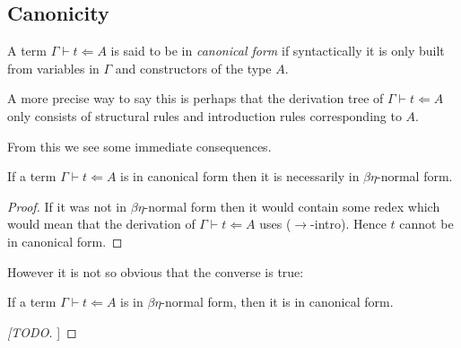 
\subsection{Canonicity}

\begin{defin}
    A term $\Gamma \vdash t \Leftarrow A$ is said to be in \emph{canonical form} if syntactically it is only built from variables in $\Gamma$ and constructors of the type $A$.
\end{defin}

\begin{remark}
    A more precise way to say this is perhaps that the derivation tree of $\Gamma \vdash t \Leftarrow A$ only consists of structural rules and introduction rules corresponding to $A$.
\end{remark}

From this we see some immediate consequences.

\begin{lemma}
    If a term $\Gamma \vdash t \Leftarrow A$ is in canonical form then it is necessarily in $\beta \eta$-normal form.
\end{lemma}

\begin{proof}
    If it was not in $\beta \eta$-normal form then it would contain some redex which would mean that the derivation of $\Gamma \vdash t \Leftarrow A$ uses ($\to$-intro). Hence $t$ cannot be in canonical form.
\end{proof}

However it is not so obvious that the converse is true:

\begin{lemma}
    If a term $\Gamma \vdash t \Leftarrow A$ is in $\beta \eta$-normal form, then it is in canonical form.
\end{lemma}

\begin{proof}
    [[TODO]]
\end{proof}







